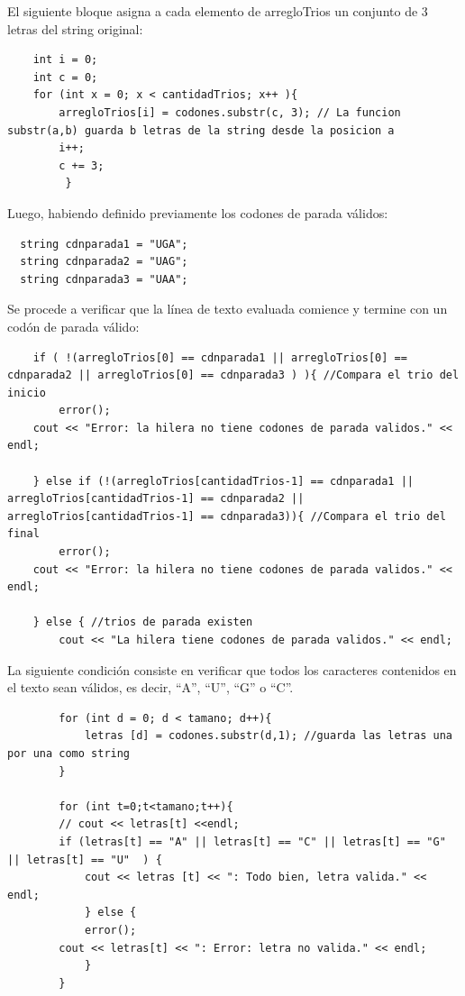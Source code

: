 \begin{itemize}
El siguiente bloque asigna a cada elemento de arregloTrios un conjunto de 3 letras del string original:

\begin{verbatim}
	int i = 0;
	int c = 0;
	for (int x = 0; x < cantidadTrios; x++ ){
		arregloTrios[i] = codones.substr(c, 3); // La funcion substr(a,b) guarda b letras de la string desde la posicion a
		i++;
		c += 3;
   		 }
\end{verbatim}

Luego, habiendo definido previamente los codones de parada válidos:

\begin{verbatim}
  string cdnparada1 = "UGA";
  string cdnparada2 = "UAG";
  string cdnparada3 = "UAA";
\end{verbatim}

Se procede a verificar que la línea de texto evaluada comience y termine con un codón de parada válido:

\begin{verbatim}
    if ( !(arregloTrios[0] == cdnparada1 || arregloTrios[0] == cdnparada2 || arregloTrios[0] == cdnparada3 ) ){ //Compara el trio del inicio
		error();
    cout << "Error: la hilera no tiene codones de parada validos." << endl;
		
	} else if (!(arregloTrios[cantidadTrios-1] == cdnparada1 || arregloTrios[cantidadTrios-1] == cdnparada2 || arregloTrios[cantidadTrios-1] == cdnparada3)){ //Compara el trio del final
		error();
    cout << "Error: la hilera no tiene codones de parada validos." << endl;
		
	} else { //trios de parada existen
		cout << "La hilera tiene codones de parada validos." << endl;
\end{verbatim}
La siguiente condición consiste en verificar que todos los caracteres contenidos en el texto sean válidos, es decir, ``A'', ``U'', ``G'' o ``C''.

\begin{verbatim}
		for (int d = 0; d < tamano; d++){
			letras [d] = codones.substr(d,1); //guarda las letras una por una como string
		}

		for (int t=0;t<tamano;t++){
  		// cout << letras[t] <<endl;
  		if (letras[t] == "A" || letras[t] == "C" || letras[t] == "G" || letras[t] == "U"  ) {
  			cout << letras [t] << ": Todo bien, letra valida." << endl;
  			} else {
  			error();
        cout << letras[t] << ": Error: letra no valida." << endl;
  			}
  		}  
\end{verbatim}


\end{itemize}

